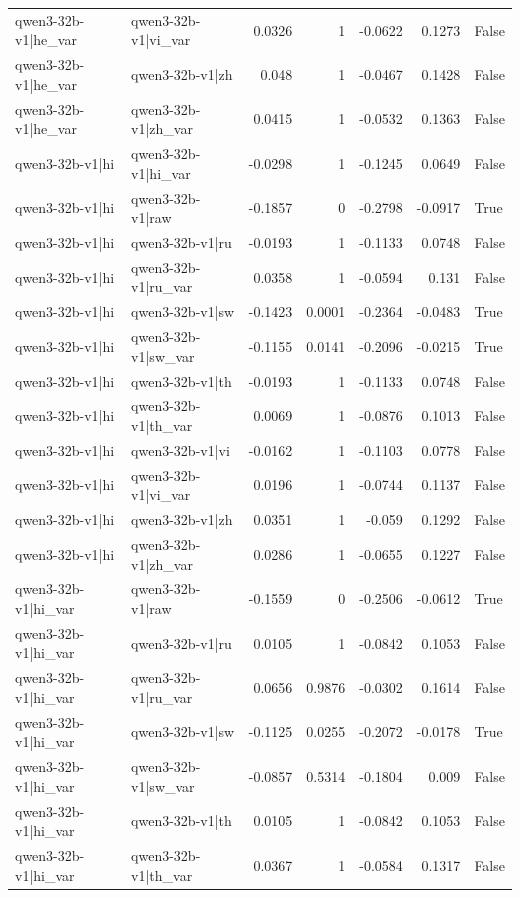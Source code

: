 \begin{table}
\begin{tabular}{l l r r r r l}
qwen3-32b-v1|he_var & qwen3-32b-v1|vi_var & 0.0326 & 1 & -0.0622 & 0.1273 & False \\
qwen3-32b-v1|he_var & qwen3-32b-v1|zh & 0.048 & 1 & -0.0467 & 0.1428 & False \\
qwen3-32b-v1|he_var & qwen3-32b-v1|zh_var & 0.0415 & 1 & -0.0532 & 0.1363 & False \\
qwen3-32b-v1|hi & qwen3-32b-v1|hi_var & -0.0298 & 1 & -0.1245 & 0.0649 & False \\
qwen3-32b-v1|hi & qwen3-32b-v1|raw & -0.1857 & 0 & -0.2798 & -0.0917 & True \\
qwen3-32b-v1|hi & qwen3-32b-v1|ru & -0.0193 & 1 & -0.1133 & 0.0748 & False \\
qwen3-32b-v1|hi & qwen3-32b-v1|ru_var & 0.0358 & 1 & -0.0594 & 0.131 & False \\
qwen3-32b-v1|hi & qwen3-32b-v1|sw & -0.1423 & 0.0001 & -0.2364 & -0.0483 & True \\
qwen3-32b-v1|hi & qwen3-32b-v1|sw_var & -0.1155 & 0.0141 & -0.2096 & -0.0215 & True \\
qwen3-32b-v1|hi & qwen3-32b-v1|th & -0.0193 & 1 & -0.1133 & 0.0748 & False \\
qwen3-32b-v1|hi & qwen3-32b-v1|th_var & 0.0069 & 1 & -0.0876 & 0.1013 & False \\
qwen3-32b-v1|hi & qwen3-32b-v1|vi & -0.0162 & 1 & -0.1103 & 0.0778 & False \\
qwen3-32b-v1|hi & qwen3-32b-v1|vi_var & 0.0196 & 1 & -0.0744 & 0.1137 & False \\
qwen3-32b-v1|hi & qwen3-32b-v1|zh & 0.0351 & 1 & -0.059 & 0.1292 & False \\
qwen3-32b-v1|hi & qwen3-32b-v1|zh_var & 0.0286 & 1 & -0.0655 & 0.1227 & False \\
qwen3-32b-v1|hi_var & qwen3-32b-v1|raw & -0.1559 & 0 & -0.2506 & -0.0612 & True \\
qwen3-32b-v1|hi_var & qwen3-32b-v1|ru & 0.0105 & 1 & -0.0842 & 0.1053 & False \\
qwen3-32b-v1|hi_var & qwen3-32b-v1|ru_var & 0.0656 & 0.9876 & -0.0302 & 0.1614 & False \\
qwen3-32b-v1|hi_var & qwen3-32b-v1|sw & -0.1125 & 0.0255 & -0.2072 & -0.0178 & True \\
qwen3-32b-v1|hi_var & qwen3-32b-v1|sw_var & -0.0857 & 0.5314 & -0.1804 & 0.009 & False \\
qwen3-32b-v1|hi_var & qwen3-32b-v1|th & 0.0105 & 1 & -0.0842 & 0.1053 & False \\
qwen3-32b-v1|hi_var & qwen3-32b-v1|th_var & 0.0367 & 1 & -0.0584 & 0.1317 & False \\

\end{tabular}
\end{table}
